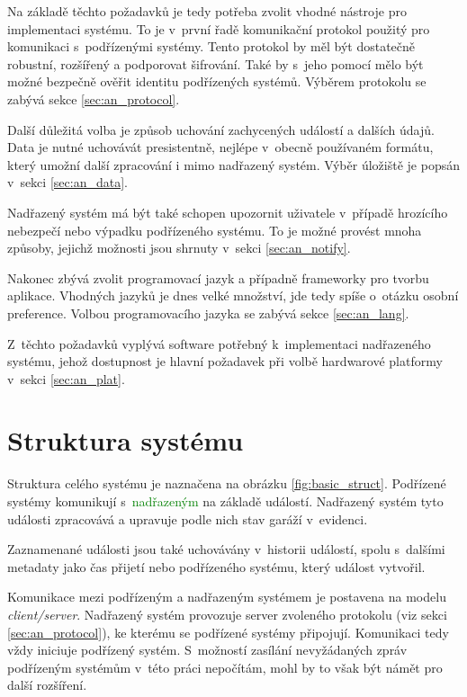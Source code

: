 Na základě těchto požadavků je tedy potřeba zvolit vhodné nástroje pro implementaci systému. To je v~první řadě komunikační protokol použitý pro komunikaci s~podřízenými systémy. Tento protokol by měl být dostatečně robustní, rozšířený a podporovat šifrování. Také by s~jeho pomocí mělo být možné bezpečně ověřit identitu podřízených systémů. Výběrem protokolu se zabývá sekce \ref{sec:an_protocol}.

Další důležitá volba je způsob uchování zachycených událostí a dalších údajů. Data je nutné uchovávát presistentně, nejlépe v~obecně používaném formátu, který umožní další zpracování i mimo nadřazený systém. Výběr úložiště je popsán v~sekci \ref{sec:an_data}.

Nadřazený systém má být také schopen upozornit uživatele v~případě hrozícího nebezpečí nebo výpadku podřízeného systému. To je možné provést mnoha způsoby, jejichž možnosti jsou shrnuty v~sekci \ref{sec:an_notify}.

Nakonec zbývá zvolit programovací jazyk a případně frameworky pro tvorbu aplikace. Vhodných jazyků je dnes velké množství, jde tedy spíše o~otázku osobní preference. Volbou programovacího jazyka se zabývá sekce \ref{sec:an_lang}.

Z~těchto požadavků vyplývá software potřebný k~implementaci nadřazeného systému, jehož dostupnost je hlavní požadavek při volbě hardwarové platformy v~sekci \ref{sec:an_plat}. 

\section{Struktura systému}
\label{sec:an_struct}

Struktura celého systému je naznačena na obrázku \ref{fig:basic_struct}. \textcolor{blue2}{Podřízené systémy} komunikují s~\textcolor{green}{nadřazeným} na základě událostí. Nadřazený systém tyto události zpracovává a upravuje podle nich stav garáží v~evidenci. 

Zaznamenané události jsou také uchovávány v~historii událostí, spolu s~dalšími metadaty jako čas přijetí nebo podřízeného systému, který událost vytvořil.

Komunikace mezi podřízeným a nadřazeným systémem je postavena na modelu \textit{client/server}. Nadřazený systém provozuje server zvoleného protokolu (viz sekci \ref{sec:an_protocol}), ke kterému se podřízené systémy připojují. Komunikaci tedy vždy iniciuje podřízený systém. S~možností zasílání nevyžádaných zpráv podřízeným systémům v~této práci nepočítám, mohl by to však být námět pro další rozšíření.


